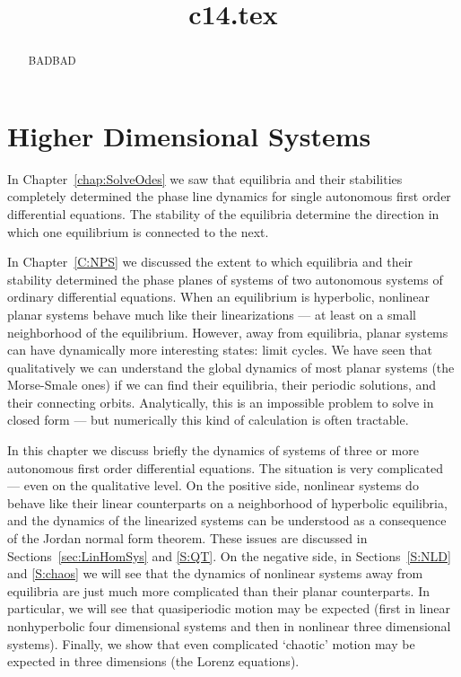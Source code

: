 \documentclass{ximera}
\title{c14.tex}
\begin{document}
\begin{abstract}
BADBAD
\end{abstract}
\maketitle

\chapter{Higher Dimensional Systems}
\label{C:HDS}

\normalsize

In Chapter~\ref{chap:SolveOdes} we saw that equilibria and their 
stabilities completely determined the phase line dynamics for single
autonomous first order differential equations.  The stability of the
equilibria determine the direction in which one equilibrium is connected 
to the next.

In Chapter~\ref{C:NPS} we discussed the extent to which equilibria and 
their stability determined the phase planes of systems of two autonomous 
systems of ordinary differential equations.  When an equilibrium is 
hyperbolic, nonlinear planar systems behave much like their linearizations 
--- at least on a small neighborhood of the equilibrium.  However, away 
from equilibria, planar systems can have dynamically more interesting 
states: limit cycles.  We have seen that qualitatively we can understand the
global dynamics of most planar systems (the Morse-Smale ones) if we can find 
their equilibria, their periodic
solutions, and their connecting orbits.  Analytically, this is an impossible
problem to solve in closed form --- but numerically this kind of calculation
is often tractable.

In this chapter we discuss briefly the dynamics of systems of three or
more autonomous first order differential equations.  The situation is
very complicated --- even on the qualitative level.  On the positive
side, nonlinear systems do behave like their linear counterparts on a
neighborhood of hyperbolic equilibria, and the dynamics of the linearized
systems can be understood as a consequence of the Jordan normal form theorem.
These issues are discussed in Sections~\ref{sec:LinHomSys} and \ref{S:QT}.  
On the negative side, in Sections~\ref{S:NLD} and \ref{S:chaos} we will see 
that the dynamics of nonlinear systems away from equilibria are just much 
more complicated than their planar counterparts.  In particular, we will see 
that quasiperiodic motion may be expected (first in linear nonhyperbolic four 
dimensional systems and then in nonlinear three dimensional systems).  
Finally, we show that even complicated `chaotic' motion may be expected in 
three dimensions (the Lorenz equations). 
\end{document}
